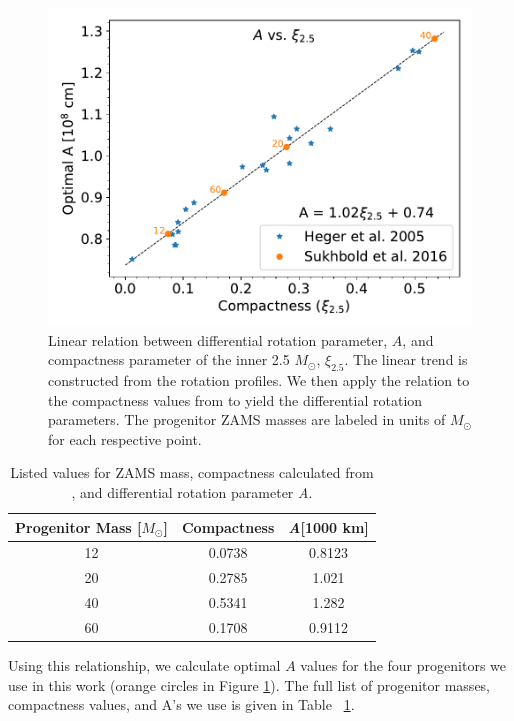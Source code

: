 \documentclass[twocolumn,times]{aastex62}  %
\begin{document}
\begin{figure}[t]
    \centering
    \includegraphics[scale=0.45]{a_vs_compact.pdf}
    \caption{Linear relation between differential rotation parameter, $A$, and compactness parameter of the inner 2.5 $M_\odot$, $\xi_{2.5}$.  The linear trend is constructed from the \citet{heger:2005} rotation profiles.  We then apply the relation to the compactness values from \citet{Suk:2016} to yield the differential rotation parameters.  The progenitor ZAMS masses are labeled in units of $M_\odot$ for each respective point.}
    \label{fig:a_vs_comp}
\end{figure}

\begin{table}[t]
\begin{tabular}{c|c|c}
Progenitor Mass [$M_\odot$] & Compactness & \textit{A}[1000 km] \\
\hline
12  & 0.0738 &         0.8123             \\
20  & 0.2785 &         1.021            \\
40  & 0.5341 &         1.282           \\
60  & 0.1708 &         0.9112          
\end{tabular}
\caption{Listed values for ZAMS mass, compactness calculated from \citet{Suk:2016}, and differential rotation parameter \textit{A}.}
\label{table:compact}
\end{table}

Using this relationship, we calculate optimal $A$ values for the four \citet{Suk:2016} progenitors we use in this work (orange circles in Figure \ref{fig:a_vs_comp}).  
The full list of progenitor masses, compactness values, and A's we use is given in Table ~\ref{table:compact}.  
\end{document}
